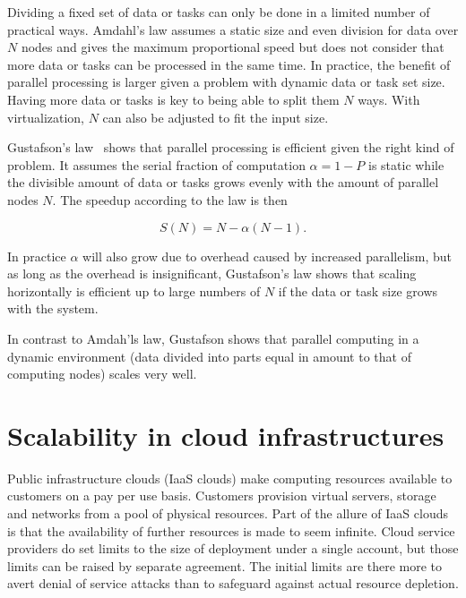 \documentclass[english]{tktltiki2}
\theoremstyle{definition}
\theoremstyle{remark}
\begin{document}
Dividing a fixed set of data or tasks can only be done in a limited number of
practical ways. Amdahl’s law assumes a static size and even division for data
over $N$ nodes and gives the maximum proportional speed but does not consider
that more data or tasks can be processed in the same time. In practice, the
benefit of parallel processing is larger given a problem with dynamic data or
task set size. Having more data or tasks is key to being able to split them $N$
ways. With virtualization, $N$ can also be adjusted to fit the input size.

Gustafson’s law~\cite{gustafsonslaw} shows that parallel processing is efficient
given the right kind of problem. It assumes the serial fraction of computation
$\alpha=1-P$ is static while the divisible amount of data or tasks grows evenly
with the amount of parallel nodes $N$. The speedup  according to the law is then

\[
S(N) = N - \alpha(N-1).
\]

In practice $\alpha$ will also grow due to overhead caused by increased
parallelism, but as long as the overhead is insignificant, Gustafson’s law shows
that scaling horizontally is efficient up to large numbers of $N$ if the data or
task size grows with the system.

In contrast to Amdah’ls law, Gustafson shows that parallel computing in a
dynamic environment (data divided into parts equal in amount to that of
computing nodes) scales very well.




\section{Scalability in cloud infrastructures}
\label{sec:cloudscalability}

Public infrastructure clouds (IaaS clouds) make computing resources available to
customers on a pay per use basis. Customers provision virtual servers, storage
and networks from a pool of physical resources. Part of the allure of IaaS
clouds is that the availability of further resources is made to seem infinite.
Cloud service providers do set limits to the size of deployment under a single
account, but those limits can be raised by separate agreement. The initial
limits are there more to avert denial of service attacks than to safeguard
against actual resource depletion.
\end{document}
